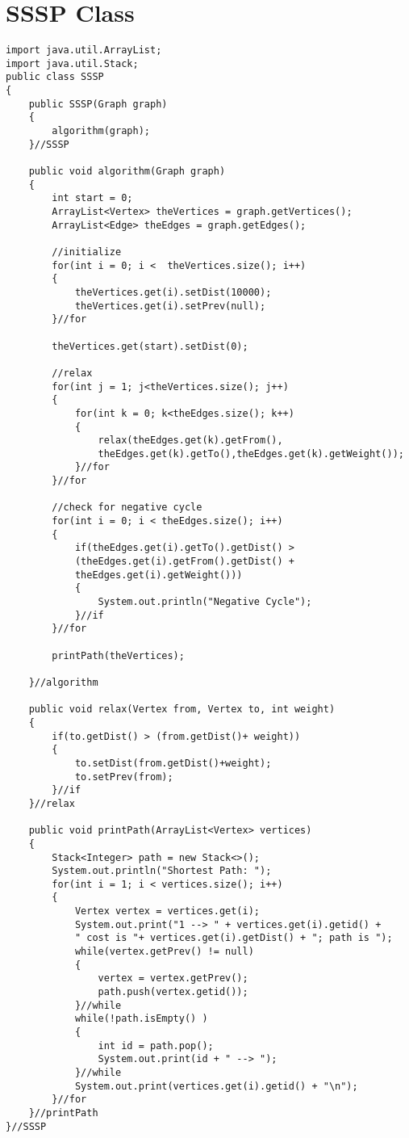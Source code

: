 \documentclass{article}
\begin{document}
\small
\section{SSSP Class}
\begin{lstlisting}[frame =single,
backgroundcolor = \color{grey!12}]
import java.util.ArrayList;
import java.util.Stack;
public class SSSP 
{
	public SSSP(Graph graph)
	{
		algorithm(graph);
	}//SSSP
	
	public void algorithm(Graph graph)
	{
		int start = 0; 
		ArrayList<Vertex> theVertices = graph.getVertices();
		ArrayList<Edge> theEdges = graph.getEdges();
		
		//initialize 
		for(int i = 0; i <  theVertices.size(); i++)
		{
			theVertices.get(i).setDist(10000);
			theVertices.get(i).setPrev(null);
		}//for
		
		theVertices.get(start).setDist(0);
		
		//relax 
		for(int j = 1; j<theVertices.size(); j++)
		{
			for(int k = 0; k<theEdges.size(); k++)
			{
				relax(theEdges.get(k).getFrom(), 
				theEdges.get(k).getTo(),theEdges.get(k).getWeight());
			}//for
		}//for
		
		//check for negative cycle
		for(int i = 0; i < theEdges.size(); i++)
		{
			if(theEdges.get(i).getTo().getDist() >
			(theEdges.get(i).getFrom().getDist() +
			theEdges.get(i).getWeight()))
			{
				System.out.println("Negative Cycle");
			}//if
		}//for
		
		printPath(theVertices);
				
	}//algorithm
	
	public void relax(Vertex from, Vertex to, int weight)
	{
		if(to.getDist() > (from.getDist()+ weight))
		{
			to.setDist(from.getDist()+weight);
			to.setPrev(from);
		}//if
	}//relax

	public void printPath(ArrayList<Vertex> vertices)
	{
		Stack<Integer> path = new Stack<>();
		System.out.println("Shortest Path: ");
		for(int i = 1; i < vertices.size(); i++)
		{
			Vertex vertex = vertices.get(i);
			System.out.print("1 --> " + vertices.get(i).getid() + 
			" cost is "+ vertices.get(i).getDist() + "; path is ");
			while(vertex.getPrev() != null)
			{
				vertex = vertex.getPrev();
				path.push(vertex.getid());
			}//while
			while(!path.isEmpty() )
			{
				int id = path.pop();
				System.out.print(id + " --> ");
			}//while
			System.out.print(vertices.get(i).getid() + "\n");
		}//for
	}//printPath
}//SSSP

\end{lstlisting}
\large
\end{document}
